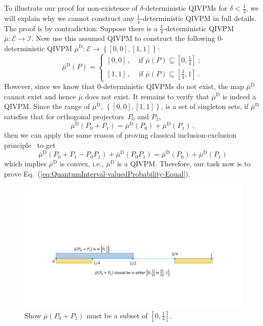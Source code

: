 \documentclass[english,reprint, aps, prl,superscriptaddress, showpacs,
showkeys, longbibliography, amsmath, amssymb, floatfix]{revtex4-1}
\theoremstyle{plain}
\theoremstyle{definition}
\newcommand{\events}{\ensuremath{\mathcal{E}}}
\newcommand{\imposs}{\ensuremath{\left[0,0\right]}}
\newcommand{\necess}{\ensuremath{\left[1,1\right]}}
\begin{document}
To illustrate our proof for non-existence of $\delta$-deterministic
QIVPMs for $\delta<\frac{1}{3}$, we will explain why we cannot construct
any $\frac{1}{4}$-deterministic QIVPM in full details. The proof
is by contradiction: Suppose there is a $\frac{1}{4}$-deterministic
QIVPM~$\bar{\mu}:\events\rightarrow\mathscr{I}$. Now use this assumed
QIVPM to construct the following $0$-deterministic QIVPM $\bar{\mu}^{\textrm{D}}:\events\rightarrow\left\{ \imposs,\necess\right\} $:
\begin{equation}
\bar{\mu}^{\textrm{D}}\left(P\right)=\begin{cases}
\imposs\,, & \textrm{ if }\bar{\mu}\left(P\right)\subseteq\left[0,\tfrac{1}{4}\right]\:;\\
\necess\,, & \textrm{ if }\bar{\mu}\left(P\right)\subseteq\left[\tfrac{3}{4},1\right]\:.
\end{cases}
\end{equation}
However, since we know that $0$-deterministic QIVPMs do not exist,
the map $\bar{\mu}^{\textrm{D}}$ cannot exist and hence $\bar{\mu}$
does not exist. It remains to verify that $\bar{\mu}^{\textrm{D}}$
is indeed a QIVPM. Since the range of $\bar{\mu}^{\textrm{D}}$, $\left\{ \imposs,\necess\right\} $,
is a set of singleton sets, if $\bar{\mu}^{\textrm{D}}$ satisfies
that for orthogonal projectors~$P_{0}$ and $P_{1}$, 
\begin{equation}
\bar{\mu}^{\textrm{D}}\left(P_{0}+P_{1}\right)=\bar{\mu}^{\textrm{D}}\left(P_{0}\right)+\bar{\mu}^{\textrm{D}}\left(P_{1}\right)\,,\label{eq:QuantumInterval-valuedProbability-Equal}
\end{equation}
then we can apply the same reason of proving classical inclusion-exclusion
principle~\cite{TaiThesis2018} to get 
\[
\bar{\mu}^{\textrm{D}}\left(P_{0}+P_{1}-P_{0}P_{1}\right)+\bar{\mu}^{\textrm{D}}\left(P_{0}P_{1}\right)=\bar{\mu}^{\textrm{D}}\left(P_{0}\right)+\bar{\mu}^{\textrm{D}}\left(P_{1}\right)
\]
which implies $\bar{\mu}^{\textrm{D}}$ is convex, i.e., $\bar{\mu}^{\textrm{D}}$
is a QIVPM. Therefore, our task now is to prove Eq.~(\ref{eq:QuantumInterval-valuedProbability-Equal}).

\begin{figure}
\includegraphics[bb=50bp 100bp 900bp 300bp,clip,scale=0.5]{prop_prop_letter_ajhs_referee_response_pptx}\caption{\label{fig:Show-subset}Show $\bar{\mu}\left(P_{0}+P_{1}\right)$
must be a subset of $\left[0,\frac{1}{4}\right]$.}
\end{figure}
\end{document}
